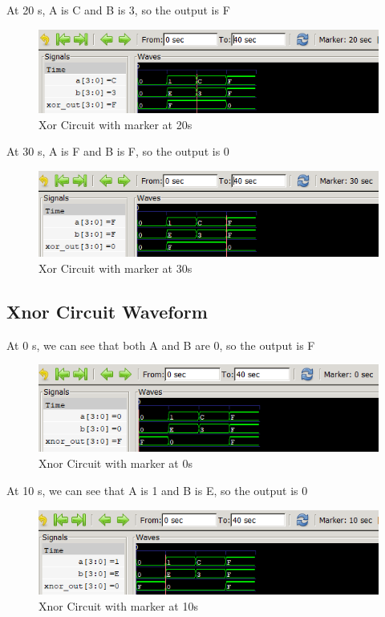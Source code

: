 \documentclass[12pt]{article}
\begin{document}
At 20 s, A is C and B is 3, so the output is F
\begin{figure}[h]
    \centering
    \includegraphics[width = 1.0\textwidth]{figs/Xor20.png}
    \caption{Xor Circuit with marker at 20s}
    \label{fig:enter-label}
\end{figure}


At 30 s, A is F and B is F, so the output is 0
\begin{figure}[h]
    \centering
    \includegraphics[width = 1.0\textwidth]{figs/Xor30.png}
    \caption{Xor Circuit with marker at 30s}
    \label{fig:enter-label}
\end{figure}

\newpage


\subsection{Xnor Circuit Waveform}

At 0 s, we can see that both A and B are 0, so the output is F
\begin{figure}[h]
    \centering
    \includegraphics[width = 1.0\textwidth]{figs/Xnor0.png}
    \caption{Xnor Circuit with marker at 0s}
    \label{fig:enter-label}
\end{figure}


At 10 s, we can see that A is 1 and B is E, so the output is 0
\begin{figure}[h]
    \centering
    \includegraphics[width = 1.0\textwidth]{figs/Xnor10.png}
    \caption{Xnor Circuit with marker at 10s}
    \label{fig:enter-label}
\end{figure}
\end{document}
